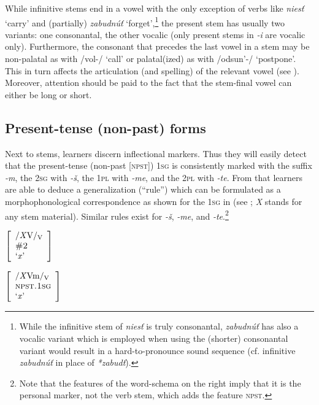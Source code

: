 \documentclass[output=paper,colorlinks,citecolor=brown,
]{langscibook}
\begin{document}
While infinitive stems end in a vowel with the only exception of verbs like \textit{niesť} `carry' and (partially) \textit{zabudnúť} `forget',\footnote{While the infinitive stem of \textit{niesť} is truly consonantal, \textit{zabudnúť} has also a vocalic variant which is employed when using the (shorter) consonantal variant would result in a hard-to-pronounce sound sequence (cf. infinitive \textit{zabudnúť} in place of \textit{*zabudť}).} the present stem has usually two variants: one consonantal, the other vocalic (only present stems in \textit{-i} are vocalic only). Furthermore, the consonant that precedes the last vowel in a stem may be non-palatal as with /vol-/ `call' or palatal(ized) as with /odsun'-/ `postpone'. This in turn affects the articulation (and spelling) of the relevant vowel (see ). Moreover, attention should be paid to the fact that the stem-final vowel can either be long or short.


\subsection{Present-tense (non-past) forms}\label{sec:PresentTense}

Next to stems, learners discern inflectional markers. Thus they will easily detect that the present-tense (non-past [\textsc{npst}]) \textsc{1sg} is consistently marked with the suffix \textit{-m}, the \textsc{2sg} with \textit{-š}, the \textsc{1pl} with \textit{-me}, and the \textsc{2pl} with \textit{-te}. From that learners are able to deduce a generalization (``rule'') which can be formulated as a morphophonological correspondence as shown for the \textsc{1sg} in  (see \citealt[47--48]{HaspelmathSims2010}; \textit{X} stands for any stem material). Similar rules exist for \textit{-š}, \textit{-me}, and \textit{-te}.\footnote{Note that the features of the word-schema on the right imply that it is the personal marker, not the verb stem, which adds the feature \textsc{npst}.}

\begin{minipage}[t]{0.26\textwidth}
\ea\label{ex:rule1SG}
$\left[
\begin{array}{l}
    \text{/\textit{X}V/\textsubscript{V}} \\
    \textsc{\#2} \\
    \text{`\textit{x}'}
\end{array}
\right] $ 
\z
\end{minipage}%
\begin{minipage}[t]{0.45\textwidth}
\begin{exe}
\exi{$\longleftrightarrow$}
$\left[
\begin{array}{l}
    \text{/\textit{X}Vm/\textsubscript{V}} \\
    \textsc{npst.1sg} \\
    \text{`\textit{x}'}
\end{array}
\right] $
\end{exe}
\end{minipage}
\end{document}
